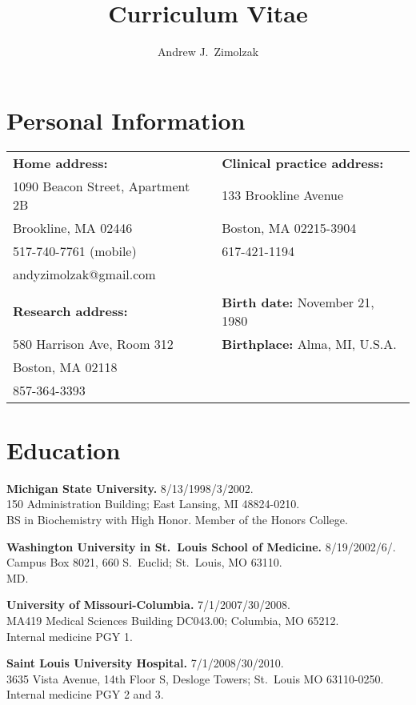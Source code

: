 \documentclass[12pt]{article}
\title{Curriculum Vitae}
\author{Andrew J.\ Zimolzak}
\begin{document}
\thispagestyle{fancy}

\section*{Personal Information}

\begin{tabular}{l l}
\textbf{Home address:}           & \textbf{Clinical practice address:}\\
1090 Beacon Street, Apartment 2B & 133 Brookline Avenue\\
Brookline, MA 02446              & Boston, MA 02215-3904\\
517-740-7761 (mobile)            & 617-421-1194\\
andyzimolzak@gmail.com           \\
\\
\textbf{Research address:}       & \textbf{Birth date:} November 21, 1980\\
580 Harrison Ave, Room 312       & \textbf{Birthplace:} Alma, MI, U.S.A.\\
Boston, MA 02118\\
857-364-3393
\end{tabular}

\section*{Education}

\textbf{Michigan State University.} 8/13/1998/3/2002.\\
150 Administration Building; East Lansing, MI 48824-0210.\\
BS in Biochemistry with High Honor. Member of the Honors College.

\textbf{Washington University in St.\ Louis School of Medicine.}
8/19/2002\ndash{}/6/.\\
Campus Box 8021, 660 S.\ Euclid; St.\ Louis, MO 63110.\\
MD.

\textbf{University of Missouri-Columbia.} 7/1/2007/30/2008.\\
MA419 Medical Sciences Building DC043.00; Columbia, MO 65212.\\
Internal medicine PGY 1.

\textbf{Saint Louis University Hospital.} 7/1/2008/30/2010.\\
3635 Vista Avenue, 14th Floor S, Desloge Towers; St.\ Louis MO
63110-0250.\\
Internal medicine PGY 2 and 3.
\end{document}
